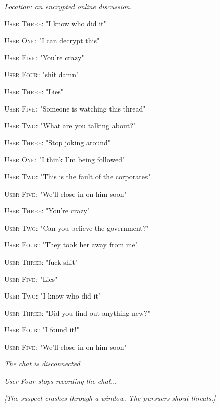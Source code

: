 \documentclass{report}
\begin{document}
\textit{Location: an encrypted online discussion}. 

\textsc{User Three}: "I know who did it" 

\textsc{User One}: "I can decrypt this" 

\textsc{User Five}: "You're crazy" 

\textsc{User Four}: "shit damn" 

\textsc{User Three}: "Lies" 

\textsc{User Five}: "Someone is watching this thread" 

\textsc{User Two}: "What are you talking about?" 

\textsc{User Three}: "Stop joking around" 

\textsc{User One}: "I think I'm being followed" 

\textsc{User Two}: "This is the fault of the corporates" 

\textsc{User Five}: "We'll close in on him soon" 

\textsc{User Three}: "You're crazy" 

\textsc{User Two}: "Can you believe the government?" 

\textsc{User Four}: "They took her away from me" 

\textsc{User Three}: "fuck shit" 

\textsc{User Five}: "Lies" 

\textsc{User Two}: "I know who did it" 

\textsc{User Three}: "Did you find out anything new?" 

\textsc{User Four}: "I found it!" 

\textsc{User Five}: "We'll close in on him soon" 

\textit{The chat is disconnected}. 

\textit{User Four stops recording the chat}...

\textit{[The suspect crashes through a window. The pursuers shout threats.]}
\end{document}
